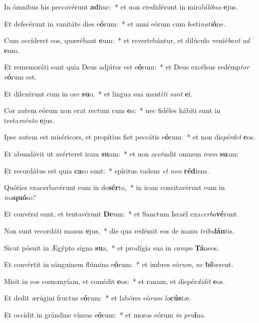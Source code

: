 \item In ómnibus his peccavérunt \textbf{ad}huc:~* et non credidérunt in mirabí\textit{li}\textit{bus} \textbf{e}jus.
\item Et defecérunt in vanitáte dies e\textbf{ó}rum:~* et anni eórum cum festi\textit{na}\textit{ti}\textbf{ó}ne.
\item Cum occíderet eos, quærébant \textbf{e}um:~* et revertebántur, et dilúculo venié\textit{bant} \textit{ad} \textbf{e}um.
\item Et rememoráti sunt quia Deus adjútor est e\textbf{ó}rum:~* et Deus excélsus redémp\textit{tor} \textit{e}\textbf{ó}rum est.
\item Et dilexérunt eum in ore \textbf{su}o,~* et lingua sua mentí\textit{ti} \textit{sunt} \textbf{e}i.
\item Cor autem eórum non erat rectum cum \textbf{e}o:~* nec fidéles hábiti sunt in testa\textit{mén}\textit{to} \textbf{e}jus.
\item Ipse autem est miséricors, et propítius fiet peccátis e\textbf{ó}rum:~* et non dis\textit{pér}\textit{det} \textbf{e}os.
\item Et abundávit ut avérteret iram \textbf{su}am:~* et non accéndit omnem \textit{i}\textit{ram} \textbf{su}am:
\item Et recordátus est quia \textbf{ca}ro sunt:~* spíritus vadens \textit{et} \textit{non} \textbf{réd}iens.
\item Quóties exacerbavérunt eum in de\textbf{sér}to,~* in iram concitavérunt eum in \textit{in}\textit{a}\textbf{quó}so?
\item Et convérsi sunt, et tentavérunt \textbf{De}um:~* et Sanctum Israël exa\textit{cer}\textit{ba}\textbf{vé}runt.
\item Non sunt recordáti manus \textbf{e}jus,~* die qua redémit eos de manu \textit{tri}\textit{bu}\textbf{lán}tis.
\item Sicut pósuit in Ægýpto signa \textbf{su}a,~* et prodígia sua in \textit{cam}\textit{po} \textbf{Tá}neos.
\item Et convértit in sánguinem flúmina e\textbf{ó}rum:~* et imbres eó\textit{rum}, \textit{ne} \textbf{bí}berent.
\item Misit in eos cœnomyíam, et comédit \textbf{e}os:~* et ranam, et dispér\textit{di}\textit{dit} \textbf{e}os.
\item Et dedit ærúgini fructus e\textbf{ó}rum:~* et labóres eó\textit{rum} \textit{lo}\textbf{cús}tæ.
\item Et occídit in grándine víneas e\textbf{ó}rum:~* et moros eórum \textit{in} \textit{pru}\textbf{í}na.
